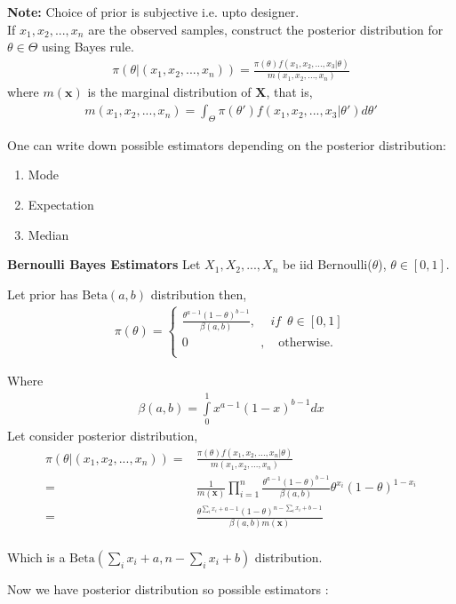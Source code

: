 \documentclass[a4paper,english,12pt]{article}
\begin{document}
\textbf{Note:}
 Choice of prior is subjective i.e. upto designer.\\

If $x_1,x_2,...,x_n$ are the observed samples, construct the posterior distribution for $\theta \in \Theta$ using Bayes rule.
\begin{align}
\pi(\theta|(x_1,x_2,...,x_n))=\frac{\pi(\theta)f(x_1,x_2,...,x_3|\theta)}{m(x_1,x_2,...,x_n)}
\end{align} 
where $m(\textbf{x})$ is the marginal distribution of $\textbf{X}$, that is,
\begin{align}
m(x_1,x_2,...,x_n)=\int_{\Theta}\pi(\theta')f(x_1,x_2,...,x_3|\theta')d\theta'
\end{align} 

One can write down possible estimators depending on the posterior distribution:
\begin{enumerate}
\item Mode
\item Expectation
\item Median
\end{enumerate}

\begin{exmp}\textbf{Bernoulli Bayes Estimators}
Let $X_1,X_2,...,X_n$ be iid Bernoulli($\theta$), $\theta \in [0,1]$.

Let prior has $\mathrm{Beta}(a,b)$ distribution then,
\begin{align}
\pi(\theta) = 
\begin{cases}
 \displaystyle{\frac{\theta^{a-1}(1-\theta)^{b-1}}{\beta(a,b)}},       \,\,\,\,\,\,\,if\,\,\,\theta \in [0,1] \\
0\,\,\,\,\,\,\,\,\,\,\,\,\,\,\,\,\,\,\,\,\,\,\,\,\,\,\,\,\,\,\,\,\,\,\,,\,\,\,\,\,\,\mathrm{otherwise}.\\
\end{cases}
\end{align} 

Where
\begin{align}
\beta(a,b) = \displaystyle{\int\limits_0^1 x^{a-1}(1-x)^{b-1}dx}
\end{align}
Let consider posterior distribution,
\begin{eqnarray}
\pi(\theta|(x_1,x_2,...,x_n))=&\displaystyle{\frac{\pi(\theta)f(x_1,x_2,...,x_n|\theta)}{m(x_1,x_2,...,x_n)}}\\
=&\displaystyle{ \frac{1}{m(\textbf{x})}\prod\limits_{i=1}^n \frac{\theta^{a-1}(1-\theta)^{b-1}}{\beta(a,b)} {\theta^{x_i}(1-\theta)^{1-x_i}}}\nonumber\\
=&\displaystyle{\frac{\theta^{\sum\limits_i {x_i}+a-1}(1-\theta)^{n-\sum\limits_i x_i +b-1}}{\beta(a,b)m(\textbf{x})}}\nonumber\\
\end{eqnarray}

Which is a $\mathrm{Beta}\left(\sum\limits_i {x_i}+a,n-\sum\limits_i x_i +b\right)$ distribution.  

\end{exmp}
Now we have posterior distribution so possible estimators :
\end{document}
